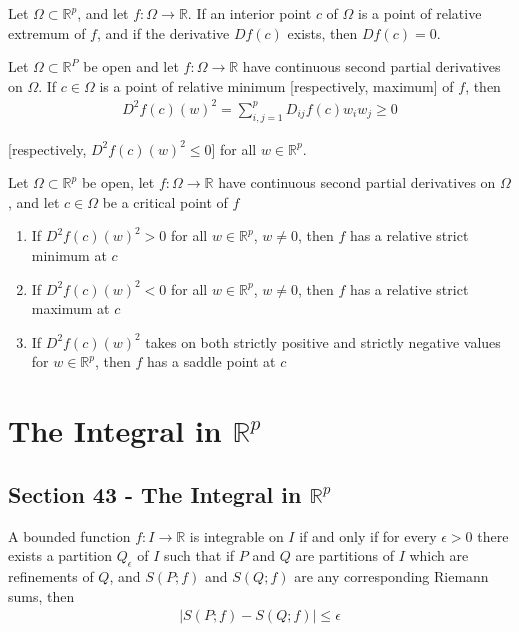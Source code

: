 \documentclass[12pt]{article}
\newcommand{\R}{\mathbb{R}}
\newenvironment{theorem}[2][Theorem]{\begin{trivlist}
\item[\hskip \labelsep {\bfseries #1}\hskip \labelsep {\bfseries #2.}]}{\end{trivlist}}
\newenvironment{corollary}[2][Corollary]{\begin{trivlist}
\item[\hskip \labelsep {\bfseries #1}\hskip \labelsep {\bfseries #2.}]}{\end{trivlist}}
\begin{document}
\begin{corollary}{42.2}
Let $\Omega \subset \R^p$, and let $f: \Omega \to \R$. If an interior point $c$ of $\Omega$ is a point of relative extremum of $f$, and if the derivative $Df(c)$ exists, then $Df(c) = 0$.
\end{corollary}

\begin{theorem}{42.4}
Let $\Omega \subset \R^P$ be open and let $f: \Omega \to \R$ have continuous second partial derivatives on $\Omega$. If $c \in \Omega$ is a point of relative minimum [respectively, maximum] of $f$, then
\begin{align*}
D^2f(c)(w)^2 = \sum_{i, j = 1}^p D_{ij}f(c)w_iw_j \geq 0
\end{align*}

[respectively, $D^2f(c)(w)^2 \leq 0$] for all $w \in \R^p$.
\end{theorem}

\begin{theorem}{42.5}
Let $\Omega \subset \R^p$ be open, let $f: \Omega \to \R$ have continuous second partial derivatives on $\Omega$, and let $c \in \Omega$ be a critical point of $f$
\begin{enumerate}[label=\alph*)]
\item If $D^2f(c)(w)^2 > 0$ for all $w \in \R^p$, $w \neq 0$, then $f$ has a relative strict minimum at $c$
\item If $D^2f(c)(w)^2 < 0$ for all $w \in \R^p$, $w \neq 0$, then $f$ has a relative strict maximum at $c$
\item If $D^2f(c)(w)^2$ takes on both strictly positive and strictly negative values for $w \in \R^p$, then $f$ has a saddle point at $c$
\end{enumerate}
\end{theorem}
\newpage
\section{The Integral in $\R^p$}

\subsection*{Section 43 - The Integral in $\mathbb{R}^p$}

\begin{theorem}[Cauchy]{Criterion}
A bounded function $f: I \to \R$ is integrable on $I$ if and only if for every $\epsilon > 0$ there exists a partition $Q_{\epsilon}$ of $I$ such that if $P$ and $Q$ are partitions of $I$ which are refinements of $Q$, and $S(P; f)$ and $S(Q; f)$ are any corresponding Riemann sums, then
\begin{align*}
|S(P; f) - S(Q; f)| \leq \epsilon
\end{align*}
\end{theorem}
\end{document}
